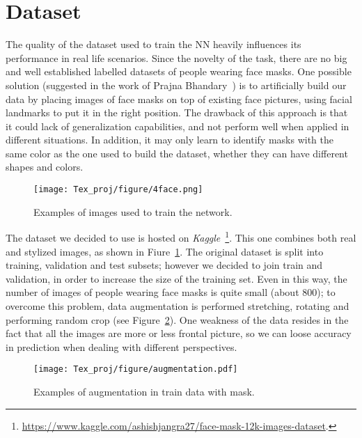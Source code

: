 \documentclass[10pt,twocolumn,letterpaper]{article}
\begin{document}
\section{Dataset}
\label{sec:data}
The quality of the dataset used to train the NN heavily influences its performance in real life scenarios. Since the novelty of the task, there are no big and well established labelled datasets of people wearing face masks. One possible solution (suggested in the work of Prajna Bhandary~\cite{Prajna}) is to artificially build our data by placing images of face masks on top of existing face pictures, using facial landmarks to put it in the right position. The drawback of this approach is that it could lack of generalization capabilities, and not perform well when applied in different situations. In addition, it may only learn to identify masks with the same color as the one used to build the dataset, whether they can have different shapes and colors.

\begin{figure}[htp]
    \centering
    \texttt{[image: Tex\_proj/figure/4face.png]}
    \caption{Examples of images used to train the network.}
    \label{fig:ex_fig_2}
\end{figure}

The dataset we decided to use is hosted on \textit{Kaggle}~\footnote{\href{https://www.kaggle.com/ashishjangra27/face-mask-12k-images-dataset}{https://www.kaggle.com/ashishjangra27/face-mask-12k-images-dataset}.}. This one combines both real and stylized images, as shown in Fiure~\ref{fig:ex_fig_2}. The original dataset is split into training, validation and test subsets; however we decided to join train and validation, in order to increase the size of the training set. Even in this way, the number of images of people wearing face masks is quite small (about 800); to overcome this problem, data augmentation is performed stretching, rotating and performing random crop (see Figure~\ref{fig:ex_aug_5}). One weakness of the data resides in the fact that all the images are more or less frontal picture, so we can loose accuracy in prediction when dealing with different perspectives.

\begin{figure}[htp]
    \centering
    \texttt{[image: Tex\_proj/figure/augmentation.pdf]}
    \caption{Examples of augmentation in train data with mask.}
    \label{fig:ex_aug_5}
\end{figure}
\end{document}
